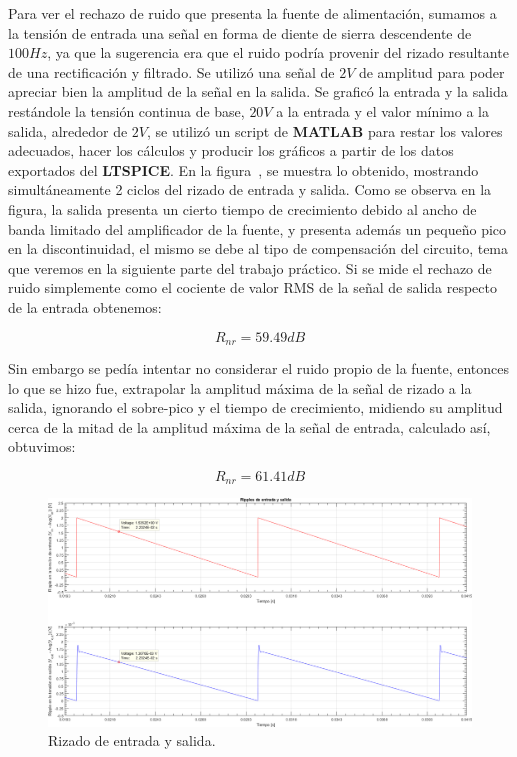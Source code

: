 
Para ver el rechazo de ruido que presenta la fuente de alimentación, sumamos a la tensión de entrada una señal en forma de diente de sierra descendente de $100 Hz$, ya que la sugerencia era que el ruido podría provenir del rizado resultante de una rectificación y filtrado. Se utilizó una señal de $2 V$ de amplitud para poder apreciar bien la amplitud de la señal en la salida. Se graficó la entrada y la salida restándole la tensión continua de base, $20 V$ a la entrada y el valor mínimo a la salida, alrededor de $2 V$, se utilizó un script de \textbf{MATLAB} para restar los valores adecuados, hacer los cálculos y producir los gráficos a partir de los datos exportados del \textbf{LTSPICE}. En la figura~, se muestra lo obtenido, mostrando simultáneamente 2 ciclos del rizado de entrada y salida.
Como se observa en la figura, la salida presenta un cierto tiempo de crecimiento debido al ancho de banda limitado del amplificador de la fuente, y presenta además un pequeño pico en la discontinuidad, el mismo se debe al tipo de compensación del circuito, tema que veremos en la siguiente parte del trabajo práctico. Si se mide el rechazo de ruido simplemente como el cociente de valor RMS de la señal de salida respecto de la entrada obtenemos:


\begin{equation}
    R_{nr}= 59.49 dB
\end{equation}

Sin embargo se pedía intentar no considerar el ruido propio de la fuente, entonces lo que se hizo fue, extrapolar la amplitud máxima de la señal de rizado a la salida, ignorando el sobre-pico y el tiempo de crecimiento, midiendo su amplitud cerca de la mitad de la amplitud máxima de la señal de entrada, calculado así, obtuvimos:


\begin{equation}
    R_{nr}= 61.41 dB
\end{equation}

\vfill

\clearpage

\begin{figure}[H] %
\begin{center}
\includegraphics[width=1.2 \textwidth, angle=90]{./img/preguntas/p20.png}
\caption{\label{fig:fig_p20_ripple}\footnotesize{Rizado de entrada y salida.}}
\end{center}
\end{figure}

\clearpage
